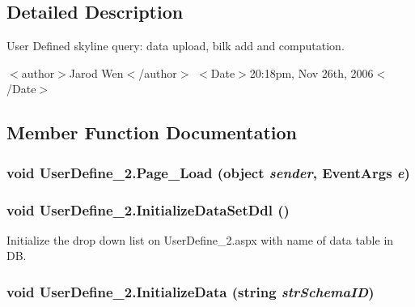 \subsection{Detailed Description}
User Defined skyline query: data upload, bilk add and computation. 

$<$author$>$Jarod Wen$<$/author$>$ $<$Date$>$20:18pm, Nov 26th, 2006$<$/Date$>$ 



\subsection{Member Function Documentation}
\subsubsection{\setlength{\rightskip}{0pt plus 5cm}void User\-Define\_\-2.Page\_\-Load (object {\em sender}, Event\-Args {\em e})\hspace{0.3cm}{\tt  [protected]}}\label{class_user_define__2_f2c3668025d7c5754bde56e107a630df}


\subsubsection{\setlength{\rightskip}{0pt plus 5cm}void User\-Define\_\-2.Initialize\-Data\-Set\-Ddl ()\hspace{0.3cm}{\tt  [private]}}\label{class_user_define__2_f7b63bcd828ad66a834225f56a505d6a}


Initialize the drop down list on User\-Define\_\-2.aspx with name of data table in DB. 

\subsubsection{\setlength{\rightskip}{0pt plus 5cm}void User\-Define\_\-2.Initialize\-Data (string {\em str\-Schema\-ID})\hspace{0.3cm}{\tt  [private]}}\label{class_user_define__2_4fb5145a113acfe9cf6352cc5c940bd6}


